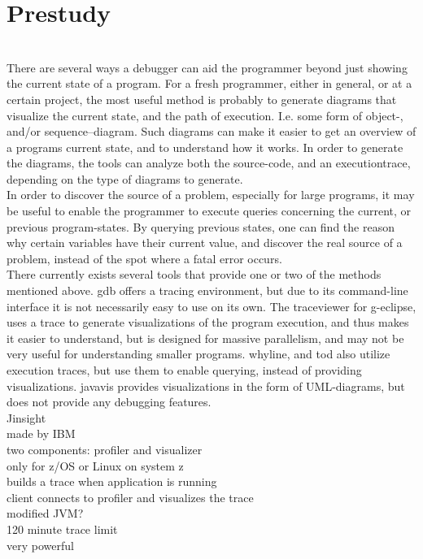 \section{Prestudy}\label{Prestudy}
~\\
There are several ways a debugger can aid the programmer beyond just showing the current state of a program.
For a fresh programmer, either in general, or at a certain project, the most useful method is probably to generate diagrams that visualize the current state, and the path of execution.
I.e. some form of object-, and/or sequence--diagram.
Such diagrams can make it easier to get an overview of a programs current state, and to understand how it works.
In order to generate the diagrams, the tools can analyze both the source-code, and an \gls{executiontrace}, depending on the type of diagrams to generate.
~\\

In order to discover the source of a problem, especially for large programs, it may be useful to enable the programmer to execute queries concerning the current, or previous program-states.
By querying previous states, one can find the reason why certain variables have their current value, and discover the real source of a problem, instead of the spot where a fatal error occurs.
~\\

There currently exists several tools that provide one or two of the methods mentioned above.
\Gls{gdb} offers a tracing environment, but due to its command-line interface %
it is not necessarily easy to use on its own.
The \gls{traceviewer} for g-eclipse, uses a trace to generate visualizations of the program execution, and thus makes it easier to understand, but is  designed for massive parallelism, and may not be very useful for understanding smaller programs.
\Gls{whyline}, and \gls{tod} also utilize execution traces, but use them to enable querying, instead of providing visualizations.
\Gls{javavis} provides visualizations in the form of UML-diagrams, but does not provide any debugging features.
~\\


Jinsight\\%
	made by IBM\\
	two components: profiler and visualizer\\
	only for z/OS or Linux on system z\\
	builds a trace when application is running\\
	client connects to profiler and visualizes the trace\\
	modified JVM?\\
	120 minute trace limit\\
	very powerful\\

